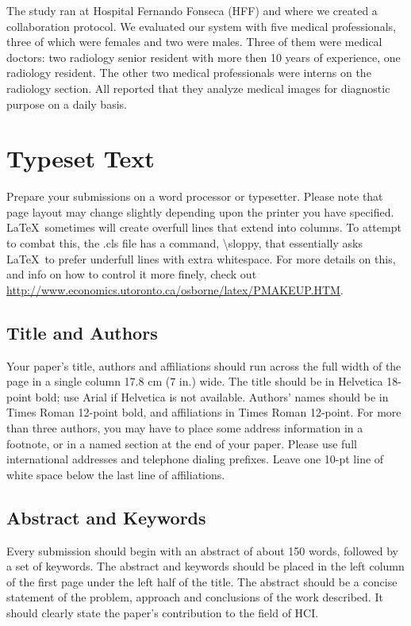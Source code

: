\documentclass{sigchi}
\begin{document}
The study ran at Hospital Fernando Fonseca (HFF) and where we created a collaboration protocol. We evaluated our system with five medical professionals, three of which were females and two were males. Three of them were medical doctors: two radiology senior resident with more then 10 years of experience, one radiology resident. The other two medical professionals were interns on the radiology section. All reported that they analyze medical images for diagnostic purpose on a daily basis.

\section{Typeset Text}

Prepare your submissions on a word processor or typesetter.  Please
note that page layout may change slightly depending upon the printer
you have specified.  \LaTeX\ sometimes will create overfull lines
that extend into columns.  To attempt to combat this, the .cls
file has a command, {\textbackslash}sloppy, that essentially asks
\LaTeX\ to prefer underfull lines with extra whitespace.  For more
details on this, and info on how to control it more finely, check out
{\url{http://www.economics.utoronto.ca/osborne/latex/PMAKEUP.HTM}}.

\subsection{Title and Authors}

Your paper's title, authors and affiliations should run across the
full width of the page in a single column 17.8 cm (7 in.) wide.  The
title should be in Helvetica 18-point bold; use Arial if Helvetica is
not available.  Authors' names should be in Times Roman 12-point bold,
and affiliations in Times Roman 12-point.  For more than three authors,
you may have to place some address information in a footnote, or in a named
section at the end of your paper. Please use full international addresses and
telephone dialing prefixes.  Leave one 10-pt line of white space below the last
line of affiliations.

\subsection{Abstract and Keywords}

Every submission should begin with an abstract of about 150 words,
followed by a set of keywords. The abstract and keywords should be
placed in the left column of the first page under the left half of the
title. The abstract should be a concise statement of the problem,
approach and conclusions of the work described.  It should clearly
state the paper's contribution to the field of HCI.
\end{document}

